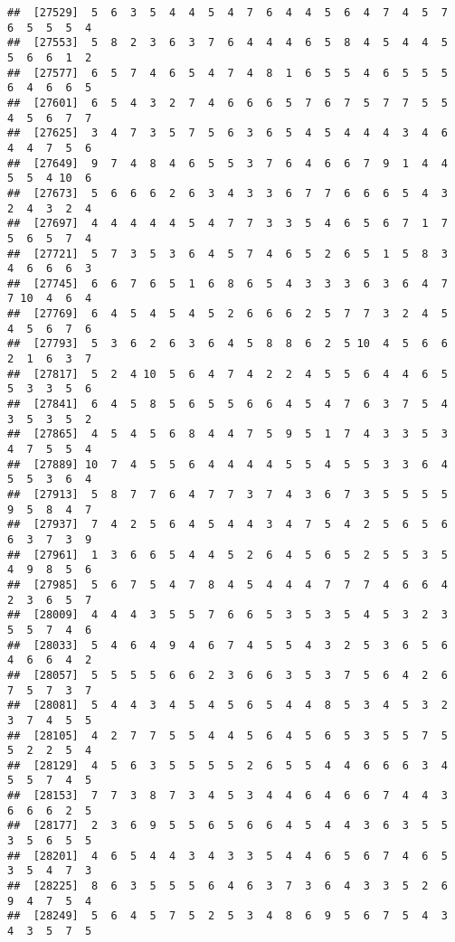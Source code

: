 \documentclass[
]{book}
\begin{document}
\begin{verbatim}
##  [27529]  5  6  3  5  4  4  5  4  7  6  4  4  5  6  4  7  4  5  7  6  5  5  5  4
##  [27553]  5  8  2  3  6  3  7  6  4  4  4  6  5  8  4  5  4  4  5  5  6  6  1  2
##  [27577]  6  5  7  4  6  5  4  7  4  8  1  6  5  5  4  6  5  5  5  6  4  6  6  5
##  [27601]  6  5  4  3  2  7  4  6  6  6  5  7  6  7  5  7  7  5  5  4  5  6  7  7
##  [27625]  3  4  7  3  5  7  5  6  3  6  5  4  5  4  4  4  3  4  6  4  4  7  5  6
##  [27649]  9  7  4  8  4  6  5  5  3  7  6  4  6  6  7  9  1  4  4  5  5  4 10  6
##  [27673]  5  6  6  6  2  6  3  4  3  3  6  7  7  6  6  6  5  4  3  2  4  3  2  4
##  [27697]  4  4  4  4  4  5  4  7  7  3  3  5  4  6  5  6  7  1  7  5  6  5  7  4
##  [27721]  5  7  3  5  3  6  4  5  7  4  6  5  2  6  5  1  5  8  3  4  6  6  6  3
##  [27745]  6  6  7  6  5  1  6  8  6  5  4  3  3  3  6  3  6  4  7  7 10  4  6  4
##  [27769]  6  4  5  4  5  4  5  2  6  6  6  2  5  7  7  3  2  4  5  4  5  6  7  6
##  [27793]  5  3  6  2  6  3  6  4  5  8  8  6  2  5 10  4  5  6  6  2  1  6  3  7
##  [27817]  5  2  4 10  5  6  4  7  4  2  2  4  5  5  6  4  4  6  5  5  3  3  5  6
##  [27841]  6  4  5  8  5  6  5  5  6  6  4  5  4  7  6  3  7  5  4  3  5  3  5  2
##  [27865]  4  5  4  5  6  8  4  4  7  5  9  5  1  7  4  3  3  5  3  4  7  5  5  4
##  [27889] 10  7  4  5  5  6  4  4  4  4  5  5  4  5  5  3  3  6  4  5  5  3  6  4
##  [27913]  5  8  7  7  6  4  7  7  3  7  4  3  6  7  3  5  5  5  5  9  5  8  4  7
##  [27937]  7  4  2  5  6  4  5  4  4  3  4  7  5  4  2  5  6  5  6  6  3  7  3  9
##  [27961]  1  3  6  6  5  4  4  5  2  6  4  5  6  5  2  5  5  3  5  4  9  8  5  6
##  [27985]  5  6  7  5  4  7  8  4  5  4  4  4  7  7  7  4  6  6  4  2  3  6  5  7
##  [28009]  4  4  4  3  5  5  7  6  6  5  3  5  3  5  4  5  3  2  3  5  5  7  4  6
##  [28033]  5  4  6  4  9  4  6  7  4  5  5  4  3  2  5  3  6  5  6  4  6  6  4  2
##  [28057]  5  5  5  5  6  6  2  3  6  6  3  5  3  7  5  6  4  2  6  7  5  7  3  7
##  [28081]  5  4  4  3  4  5  4  5  6  5  4  4  8  5  3  4  5  3  2  3  7  4  5  5
##  [28105]  4  2  7  7  5  5  4  4  5  6  4  5  6  5  3  5  5  7  5  5  2  2  5  4
##  [28129]  4  5  6  3  5  5  5  5  2  6  5  5  4  4  6  6  6  3  4  5  5  7  4  5
##  [28153]  7  7  3  8  7  3  4  5  3  4  4  6  4  6  6  7  4  4  3  6  6  6  2  5
##  [28177]  2  3  6  9  5  5  6  5  6  6  4  5  4  4  3  6  3  5  5  3  5  6  5  5
##  [28201]  4  6  5  4  4  3  4  3  3  5  4  4  6  5  6  7  4  6  5  3  5  4  7  3
##  [28225]  8  6  3  5  5  5  6  4  6  3  7  3  6  4  3  3  5  2  6  9  4  7  5  4
##  [28249]  5  6  4  5  7  5  2  5  3  4  8  6  9  5  6  7  5  4  3  4  3  5  7  5

\end{verbatim}
\end{document}

